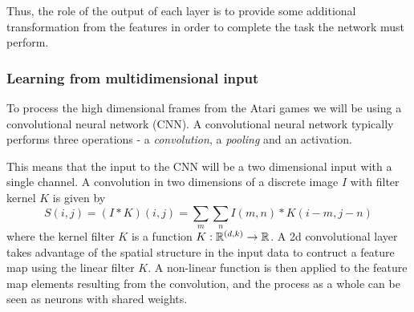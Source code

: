 \documentclass[11pt]{article}
\begin{document}
Thus, the role of the output of each layer is to provide some additional
transformation from the features in order to complete the task the network
must perform\cite{DeepLearningBook}.

\subsubsection{Learning from multidimensional input}

To process the high dimensional frames from the Atari games we will be using
a convolutional neural network (CNN).
A convolutional neural network typically performs three operations - a \textit{convolution},
a \textit{pooling} and an activation.

This means that the input to the CNN will be a two dimensional input with a single
channel. A convolution in two dimensions of a discrete image $I$ with filter kernel $K$
is given by 
\begin{equation}
    S(i, j) = (I \ast K)(i, j) = \sum\limits_m \sum\limits_n I(m, n) * K(i - m, j - n)
\end{equation}
where the kernel filter $K$ is a function $K : \mathbb{R}^{(d, k)} \to \mathbb{R}$.
A 2d convolutional layer takes advantage of the spatial structure in the input data to contruct a feature map
using the linear filter $K$.
A non-linear function is then applied to the feature map elements resulting from the convolution,
and the process as a whole can be seen as neurons with shared weights\cite{IgelConv}.
\end{document}
